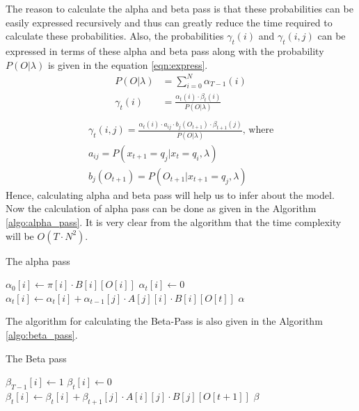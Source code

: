 \documentclass[journal, compsoc]{IEEEtran}
\begin{document}
The reason to calculate the alpha and beta pass is that these probabilities can be easily expressed recursively and thus can greatly reduce the time required to calculate these probabilities. Also, the probabilities $\gamma_t(i)$ and $\gamma_t(i, j)$ can be
expressed in terms of these alpha and beta pass along with the probability $P(O | \lambda)$ is given in the equation \ref{eqn:express}.
\begin{equation}
\label{eqn:express}
\begin{aligned}
P(O | \lambda) &= \sum_{i = 0}^{N}\alpha_{T - 1}(i)\\
\gamma_t(i) &= \frac{\alpha_t(i)\cdot \beta_t(i)}{P(O | \lambda)}\\
\end{aligned}
\end{equation}
\begin{equation}
\begin{aligned}
    \gamma_t(i, j) = \frac{\alpha_t(i)\cdot a_{ij}\cdot b_j(O_{t + 1}) \cdot \beta_{t + 1}(j)}{P(O | \lambda)} \text{, where}\\
    a_{ij} = P(x_{t + 1} = q_j | x_{t} = q_i, \lambda)\\
    b_j(O_{t + 1}) = P(O_{t + 1} | x_{t + 1} = q_j, \lambda)
\end{aligned}
\end{equation}
Hence, calculating alpha and beta pass will help us to infer about the model. Now the calculation of alpha pass can be done as given in the Algorithm \ref{algo:alpha_pass}. It is very clear from the algorithm
that the time complexity will be $O(T \cdot N^2)$.
\begin{algorithm}
\caption{The alpha pass}\label{algo:alpha_pass}
\begin{algorithmic}[1]
 
\State $\alpha_{0}[i] \gets \pi[i] \cdot B[i][O[i]]$
\EndFor
{}
\State $\alpha_t[i] \gets 0$
\State $\alpha_t[i] \gets \alpha_{t}[i] + \alpha_{t - 1}[j] \cdot A[j][i] \cdot B[i][O[t]]$
\EndFor
\EndFor
\EndFor
\State \Return $\alpha$
\EndProcedure
\end{algorithmic}
\end{algorithm}
The algorithm for calculating the Beta-Pass is also given in the Algorithm \ref{algo:beta_pass}.
\begin{algorithm}
\caption{The Beta pass}\label{algo:beta_pass}
\begin{algorithmic}[1]
 
\State $\beta_{T - 1}[i] \gets 1$
\EndFor
{}
\State $\beta_t[i] \gets 0$
\State $\beta_t[i] \gets \beta_{t}[i] + \beta_{t + 1}[j] \cdot A[i][j] \cdot B[j][O[t + 1]]$
\EndFor
\EndFor
\EndFor
\State \Return $\beta$
\EndProcedure
\end{algorithmic}
\end{algorithm}
\end{document}
